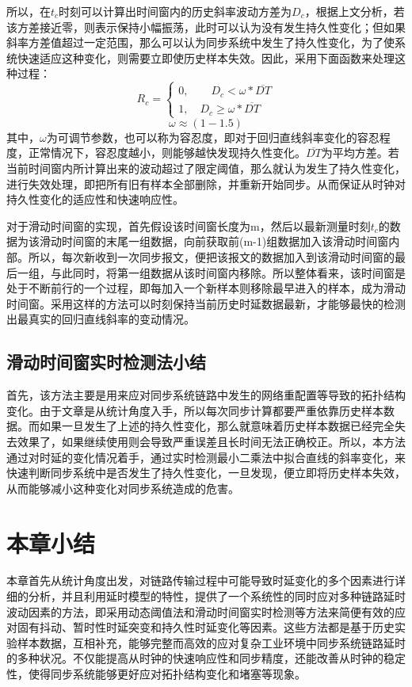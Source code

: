所以，在$t_{c}$时刻可以计算出时间窗内的历史斜率波动方差为$D_{c}$，根据上文分析，若该方差接近零，则表示保持小幅振荡，此时可以认为没有发生持久性变化；但如果斜率方差值超过一定范围，那么可以认为同步系统中发生了持久性变化，为了使系统快速适应这种变化，则需要立即使历史样本失效。因此，采用下面函数来处理这种过程：
\begin{equation}
R_{c} = \left\{
	\begin{array}{ll} %
		0, \qquad D_{c} < \omega * \overline{DT} \\
		1, \quad D_{c} \geq \omega * \overline{DT} 
	\end{array}
	\right. 
\end{equation}
\begin{equation}
	\omega \approx (1 - 1.5)
\end{equation}
其中，$\omega$为可调节参数，也可以称为容忍度，即对于回归直线斜率变化的容忍程度，正常情况下，容忍度越小，则能够越快发现持久性变化。$\overline{DT}$为平均方差。若当前时间窗内所计算出来的波动超过了限定阈值，那么就认为发生了持久性变化，进行失效处理，即把所有旧有样本全部删除，并重新开始同步。从而保证从时钟对持久性变化的适应性和快速响应性。

对于滑动时间窗的实现，首先假设该时间窗长度为m，然后以最新测量时刻$t_{c}$的数据为该滑动时间窗的末尾一组数据，向前获取前(m-1)组数据加入该滑动时间窗内部。所以，每次新收到一次同步报文，便把该报文的数据加入到该滑动时间窗的最后一组，与此同时，将第一组数据从该时间窗内移除。所以整体看来，该时间窗是处于不断前行的一个过程，即每加入一个新样本则移除最早进入的样本，成为滑动时间窗。采用这样的方法可以时刻保持当前历史时延数据最新，才能够最快的检测出最真实的回归直线斜率的变动情况。

\subsection{滑动时间窗实时检测法小结}
首先，该方法主要是用来应对同步系统链路中发生的网络重配置等导致的拓扑结构变化。由于文章是从统计角度入手，所以每次同步计算都要严重依靠历史样本数据。而如果一旦发生了上述的持久性变化，那么就意味着历史样本数据已经完全失去效果了，如果继续使用则会导致严重误差且长时间无法正确校正。所以，本方法通过对时延的变化情况着手，通过实时检测最小二乘法中拟合直线的斜率变化，来快速判断同步系统中是否发生了持久性变化，一旦发现，便立即将历史样本失效，从而能够减小这种变化对同步系统造成的危害。

\section{本章小结}
本章首先从统计角度出发，对链路传输过程中可能导致时延变化的多个因素进行详细的分析，并且利用延时模型的特性，提供了一个系统性的同时应对多种链路延时波动因素的方法，即采用动态阈值法和滑动时间窗实时检测等方法来简便有效的应对固有抖动、暂时性时延突变和持久性时延变化等因素。这些方法都是基于历史实验样本数据，互相补充，能够完整而高效的应对复杂工业环境中同步系统链路延时的多种状况。不仅能提高从时钟的快速响应性和同步精度，还能改善从时钟的稳定性，使得同步系统能够更好应对拓扑结构变化和堵塞等现象。
